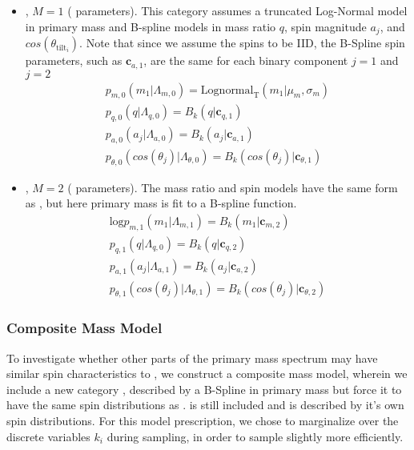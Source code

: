 \begin{itemize}
    \item \first{}, $M=1$ ( parameters). This category assumes a truncated Log-Normal model in primary mass and B-spline models in mass ratio $q$, spin magnitude $a_j$, and $cos(\theta_{\text{tilt}_i})$. Note that since we assume the spins to be IID, the B-Spline spin parameters, such as $\mathbf{c}_{a,1}$, are the same for each binary component $j=1$ and $j=2$
    \begin{eqnarray} \label{eq:lowmass}
        p_{m,0}(m_1| \Lambda_{m,0}) = \text{Lognormal}_\text{T}(m_1 | \mu_{m}, \sigma_{m}) \\
        p_{q,0}(q| \Lambda_{q,0}) = B_k(q | \mathbf{c}_{q,1}) \\
        p_{a,0}(a_j| \Lambda_{a,0}) = B_k(a_j | \mathbf{c}_{a,1}) \\
        p_{\theta,0}(cos(\theta_j)| \Lambda_{\theta,0}) = B_k( cos(\theta_j) | \mathbf{c}_{\theta,1})
    \end{eqnarray}

    \item \contB{}, $M=2$ ( parameters). The mass ratio and spin models have the same form as \first{}, but here primary mass is fit to a B-spline function. 
    \begin{eqnarray} \label{eq:contmass}
        \text{log} p_{m,1}(m_1| \Lambda_{m,1}) = B_k(m_1 | \mathbf{c}_{m, 2}) \\
        p_{q,1}(q| \Lambda_{q,0}) = B_k(q | \mathbf{c}_{q,2}) \\
        p_{a,1}(a_j| \Lambda_{a,1}) = B_k(a_j | \mathbf{c}_{a,2}) \\
        p_{\theta,1}(cos(\theta_j)| \Lambda_{\theta,1}) = B_k( cos(\theta_j) | \mathbf{c}_{\theta,2})
    \end{eqnarray}
    
\end{itemize}

\subsubsection{Composite Mass Model}

To investigate whether other parts of the primary mass spectrum may have similar spin characteristics to \first{}, we construct a composite mass model, wherein we include a new category \contA{}, described by a B-Spline in primary mass but force it to have the same spin distributions as \first{}. \contB is still included and is described by it's own spin distributions. For this model prescription, we chose to marginalize over the discrete variables $k_i$ during sampling, in order to sample slightly more efficiently. 

